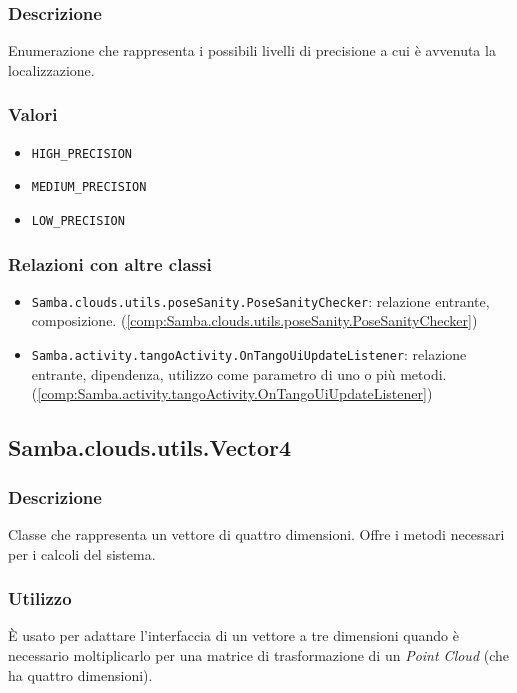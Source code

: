 \subsubsection{Descrizione}
Enumerazione che rappresenta i possibili livelli di precisione a cui è avvenuta la localizzazione.
\subsubsection{Valori}
\begin{itemize}
	\item \texttt{HIGH\_PRECISION}
	\item \texttt{MEDIUM\_PRECISION}
	\item \texttt{LOW\_PRECISION}		
\end{itemize}
\subsubsection{Relazioni con altre classi}
\begin{itemize}
	\item \texttt{Samba.clouds.utils.poseSanity.PoseSanityChecker}: relazione entrante, composizione. (\ref{comp:Samba.clouds.utils.poseSanity.PoseSanityChecker})
	\item \texttt{Samba.activity.tangoActivity.OnTangoUiUpdateListener}: relazione entrante, dipendenza, utilizzo come parametro di uno o più metodi. (\ref{comp:Samba.activity.tangoActivity.OnTangoUiUpdateListener})
\end{itemize}

\subsection{Samba.clouds.utils.Vector4}\label{comp:Samba.clouds.utils.Vector4}
\subsubsection{Descrizione}
Classe che rappresenta un vettore di quattro dimensioni. Offre i metodi necessari per i calcoli del sistema.
\subsubsection{Utilizzo}
È usato per adattare l'interfaccia di un vettore a tre dimensioni quando è necessario moltiplicarlo per una matrice di trasformazione di un \emph{Point Cloud} (che ha quattro dimensioni).
